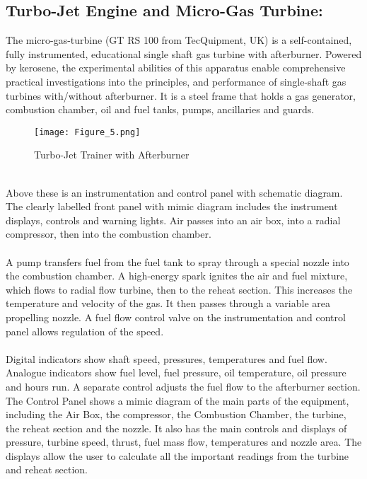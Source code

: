 \documentclass[12pt,a4paper]{article}
\begin{document}
\subsection{Turbo-Jet Engine and Micro-Gas Turbine:}
The micro-gas-turbine (GT RS 100 from TecQuipment, UK) is a self-contained, fully instrumented, educational single shaft gas turbine with afterburner. Powered by kerosene, the experimental abilities of this apparatus enable comprehensive practical investigations into the principles, and performance of single-shaft gas turbines with/without afterburner. It is a steel frame that holds a gas generator, combustion chamber, oil and fuel tanks, pumps, ancillaries and guards.\\
\begin{figure}[!ht]
	\begin{center}
		\texttt{[image: Figure\_5.png]}
	\end{center}
	\caption{Turbo-Jet Trainer with Afterburner}
\end{figure}
\clearpage
\noindent
\\Above these is an instrumentation and control panel with schematic diagram. The clearly labelled front panel with mimic diagram includes the instrument displays, controls and warning lights. Air passes into an air box, into a radial compressor, then into the combustion chamber.\\
\\A pump transfers fuel from the fuel tank to spray through a special nozzle into the combustion chamber. A high-energy spark ignites the air and fuel mixture, which flows to radial flow turbine, then to the reheat section. This increases the temperature and velocity of the gas. It then
passes through a variable area propelling nozzle. A fuel flow control valve on the instrumentation and control panel allows regulation of the speed.\\
\\Digital indicators show shaft speed, pressures, temperatures and fuel flow. Analogue indicators show fuel level, fuel pressure, oil temperature, oil pressure and hours run. A separate control adjusts the fuel flow to the afterburner section. The Control Panel shows a mimic diagram of the main parts of the equipment, including the Air Box, the compressor, the Combustion Chamber, the turbine, the reheat section and the nozzle. It also has the main controls and displays of pressure, turbine speed, thrust, fuel mass flow, temperatures and nozzle area. The displays allow the user to calculate all the important readings from the turbine and reheat section.\\
\end{document}

